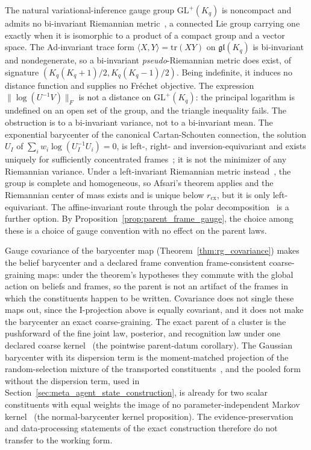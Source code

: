 \documentclass[11pt]{article}
\begin{document}
The natural variational-inference gauge group $\mathrm{GL}^+(K_q)$ is noncompact and admits no bi-invariant Riemannian metric~\cite[Lemma 7.5]{Milnor1976}, a connected Lie group carrying one exactly when it is isomorphic to a product of a compact group and a vector space. The Ad-invariant trace form $\langle X, Y \rangle = \mathrm{tr}(XY)$ on $\mathfrak{gl}(K_q)$ is bi-invariant and nondegenerate, so a bi-invariant \emph{pseudo}-Riemannian metric does exist, of signature $(K_q(K_q+1)/2, K_q(K_q-1)/2)$. Being indefinite, it induces no distance function and supplies no Fr\'echet objective. The expression $\|\log(U^{-1}V)\|_F$ is not a distance on $\mathrm{GL}^+(K_q)$: the principal logarithm is undefined on an open set of the group, and the triangle inequality fails. The obstruction is to a bi-invariant variance, not to a bi-invariant mean. The exponential barycenter of the canonical Cartan-Schouten connection, the solution $U_I$ of $\sum_i w_i \log(U_I^{-1}U_i) = 0$, is left-, right- and inversion-equivariant and exists uniquely for sufficiently concentrated frames~\cite[Thms.~11--12]{PennecArsigny2013}; it is not the minimizer of any Riemannian variance. Under a left-invariant Riemannian metric instead~\cite{Milnor1976, Andruchow2014}, the group is complete and homogeneous, so Afsari's theorem applies and the Riemannian center of mass exists and is unique below $r_{\mathrm{cx}}$, but it is only left-equivariant. The affine-invariant route through the polar decomposition~\cite{PennecFillardAyache2006} is a further option. By Proposition~\ref{prop:parent_frame_gauge}, the choice among these is a choice of gauge convention with no effect on the parent laws.

Gauge covariance of the barycenter map (Theorem~\ref{thm:rg_covariance}) makes the belief barycenter and a declared frame convention frame-consistent coarse-graining maps: under the theorem's hypotheses they commute with the global action on beliefs and frames, so the parent is not an artifact of the frames in which the constituents happen to be written. Covariance does not single these maps out, since the I-projection above is equally covariant, and it does not make the barycenter an exact coarse-graining. The exact parent of a cluster is the pushforward of the fine joint law, posterior, and recognition law under one declared coarse kernel~\cite[Ch.~9]{DennisGaugeVFE2026} (the pointwise parent-datum corollary). The Gaussian barycenter with its dispersion term is the moment-matched projection of the random-selection mixture of the transported constituents~\cite[Ch.~G8]{DennisGaugeVFESuppG2026}, and the pooled form without the dispersion term, used in Section~\ref{sec:meta_agent_state_construction}, is already for two scalar constituents with equal weights the image of no parameter-independent Markov kernel~\cite[Ch.~G8]{DennisGaugeVFESuppG2026} (the normal-barycenter kernel proposition). The evidence-preservation and data-processing statements of the exact construction therefore do not transfer to the working form.
\end{document}
